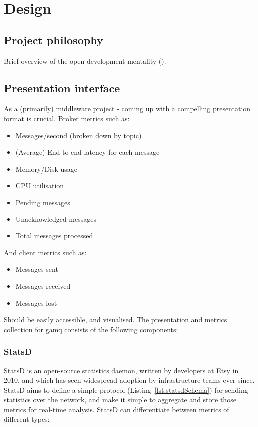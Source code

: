 \chapter{Design}
\label{chap:Design}

\section{Project philosophy}
\label{sec:Project philosophy}

Brief overview of the open development mentality ().

\section{Presentation interface}
\label{sec:presentation}

As a (primarily) middleware project - coming up with a compelling presentation
format is crucial. Broker metrics such as:

\begin{itemize}
  \item Messages/second (broken down by topic)
  \item (Average) End-to-end latency for each message
  \item Memory/Disk usage
  \item CPU utilisation
  \item Pending messages
  \item Unacknowledged messages
  \item Total messages processed
\end{itemize}

And client metrics such as:

\begin{itemize}
  \item Messages sent
  \item Messages received
  \item Messages lost
\end{itemize}

Should be easily accessible, and visualised. The presentation and metrics
collection for gamq consists of the following components:

\subsection{StatsD}
\label{sub:StatsD}

StatsD is an open-source statistics daemon, written by developers at Etsy in
2010\cite{statsd}, and which has seen widespread adoption by infrastructure
teams ever since. StatsD aims to define a simple protocol
(Listing~\ref{lst:statsdSchema}) for sending statistics over the network, and
make it simple to aggregate and store those metrics for real-time analysis.
StatsD can differentiate between metrics of different types:

